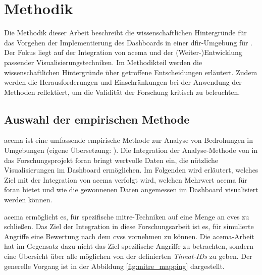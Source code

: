 \chapter{Methodik}
\label{chap:methodik}
Die Methodik dieser Arbeit beschreibt die wissenschaftlichen Hintergründe für das Vorgehen der Implementierung des Dashboards in einer \gls{dfir}-Umgebung für \oran. Der Fokus liegt auf der Integration von \gls{acema} und der (Weiter-)Entwicklung passender Visualisierungstechniken. Im Methodikteil werden die wissenschaftlichen Hintergründe über getroffene Entscheidungen erläutert. Zudem werden die Herausforderungen und Einschränkungen bei der Anwendung der Methoden reflektiert, um die Validität der Forschung kritisch zu beleuchten.
\section{Auswahl der empirischen Methode}
\label{sec:auswahlDerEmpirischenMethode}
\gls{acema} ist \glqq eine umfassende empirische Methode zur Analyse von Bedrohungen in \oran Umgebungen \grqq (eigene Übersetzung: \autocite{klementSecuring6GTransition2024}). Die Integration der Analyse-Methode von \citeauthor{klementSecuring6GTransition2024} in das Forschungsprojekt \gls{foran} bringt wertvolle Daten ein, die nützliche Visualisierungen im Dashboard ermöglichen. Im Folgenden wird erläutert, welches Ziel mit der Integration von \gls{acema} verfolgt wird, welchen Mehrwert \gls{acema} für \gls{foran} bietet und wie die gewonnenen Daten angemessen im Dashboard visualisiert werden können.
\par \gls{acema} ermöglicht es, für spezifische \gls{mitre}-Techniken auf eine Menge an \glspl{cve} zu schließen. Das Ziel der Integration in diese Forschungsarbeit ist es, für simulierte Angriffe eine Bewertung nach dem \gls{cvss} vornehmen zu können. Die \gls{acema}-Arbeit hat im Gegensatz dazu nicht das Ziel spezifische Angriffe zu betrachten, sondern eine Übersicht über alle möglichen von der \oran definierten \textit{Threat-IDs} zu geben. Der generelle Vorgang ist in der Abbildung \ref{fig:mitre_mapping} dargestellt. 

